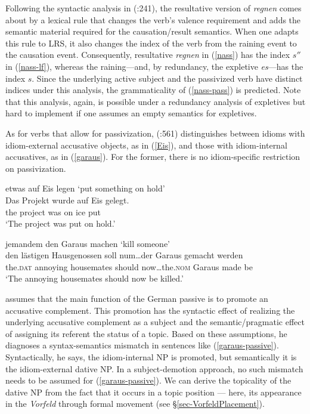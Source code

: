 \documentclass[output=paper]{langsci/langscibook}
\begin{document}
Following the syntactic analysis in \citeauthor{Mueller:02} (\citeyear{Mueller:02}:241), the resultative version of \textit{regnen} comes about by a lexical rule that changes the verb's valence requirement and adds the semantic material required for the causation/result semantics. When one adapts this rule to LRS, it also changes the index of the verb from the raining event to the causation event. Consequently, resultative \textit{regnen} in (\ref{nass}) has the index $s''$ in (\ref{nass-lf}), whereas the raining---and, by redundancy, the expletive \textit{es}---has the index $s$. Since the underlying active subject and the passivized verb have distinct indices under this analysis, the grammaticality of (\ref{nass-pass}) is predicted. Note that this analysis, again, is possible under a redundancy analysis of expletives but hard to implement if one assumes an empty semantics for expletives.

As for verbs that allow for passivization, \citeauthor{Dobrovolskij:00} (\citeyear{Dobrovolskij:00}:561) distinguishes between idioms with idiom-external accusative objects, as in (\ref{Eis}), and those with idiom-internal accusatives, as in (\ref{garaus}). For the former, there is no idiom-specific restriction on passivization.

\begin{exe}
\ex etwas auf Eis legen `put something on hold'\label{Eis}\\
\gll Das Projekt wurde auf Eis gelegt.\\
the project was on ice put\\
\glt `The project was put on hold.'
\end{exe}

\begin{exe}
\ex\label{garaus} jemandem den Garaus machen `kill someone'\\
\gll den l\"astigen Hausgenossen soll num\ldots  der Garaus gemacht werden\\
the.\textsc{dat} annoying housemates should now\ldots  the.\textsc{nom} Garaus made be\\
\glt `The annoying housemates should now be killed.'
\label{garaus-passive}
\end{exe}

\cite{Dobrovolskij:00} assumes that the main function of the   German passive is to promote an accusative complement. This promotion has the syntactic effect of realizing the underlying accusative complement as a subject and the semantic/pragmatic effect of assigning its referent the status of a topic. Based on these assumptions, he diagnoses a syntax-semantics mismatch in sentences like (\ref{garaus-passive}). Syntactically, he says, the idiom-internal NP is promoted, but semantically it is the idiom-external dative NP. In a  subject-demotion approach, no such mismatch needs to be assumed for (\ref{garaus-passive}). We can derive the topicality of the dative NP from the fact that it occurs in a topic position --- here, its appearance in the \emph{Vorfeld} through formal movement (see §\ref{sec-VorfeldPlacement}).
\end{document}
